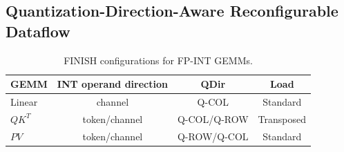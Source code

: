 \documentclass[sigconf,anonymous,nonacm]{acmart}
\newcommand{\ours}{\textsc{FINISH}}
\newcommand{\fpint}{FP-INT}
\newcommand{\wkv}{WKV}
\newcommand{\qcol}{Q-COL}
\newcommand{\qrow}{Q-ROW}
\begin{document}

\subsection{Quantization-Direction-Aware Reconfigurable Dataflow}

\begin{table}[t]
  \centering
  \caption{FINISH configurations for FP-INT GEMMs.}
  \label{tab:gemm-config}
  \begin{tabular*}{\columnwidth}
    {@{\extracolsep{\fill}}lccc@{}}
  \toprule
  GEMM & INT operand direction & QDir & Load \\
  \midrule
  Linear & channel        & Q-COL & Standard \\
  $QK^T$ & token/channel  & Q-COL/Q-ROW & Transposed \\
  $PV$   & token/channel  & Q-ROW/Q-COL & Standard \\
  \bottomrule
  \end{tabular*}
\end{table}
\end{document}
